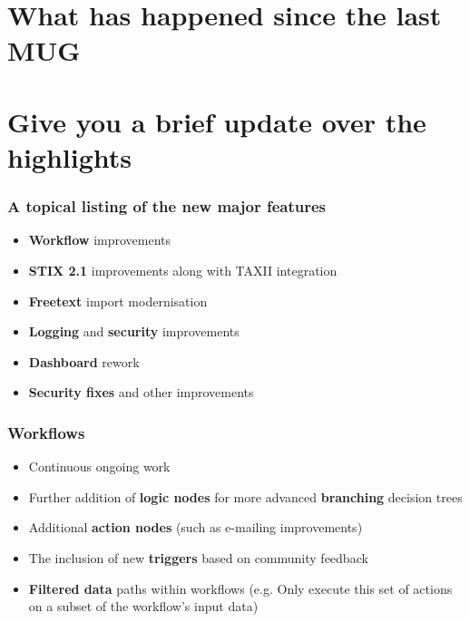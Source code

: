 
\begin{frame}
\titlepage
\end{frame}


\section{What has happened since the last MUG}

\section{Give you a brief update over the highlights}

\begin{frame}
  \frametitle{A topical listing of the new major features}
  \begin{itemize}
      \item {\bf Workflow} improvements
      \item {\bf STIX 2.1} improvements along with TAXII integration
      \item {\bf Freetext} import modernisation
      \item {\bf Logging} and {\bf security} improvements
      \item {\bf Dashboard} rework
      \item {\bf Security fixes} and other improvements
  \end{itemize}
\end{frame}


\begin{frame}
  \frametitle{Workflows}
  \begin{itemize}
     \item Continuous ongoing work
     \item Further addition of {\bf logic nodes} for more advanced {\bf branching} decision trees
     \item Additional {\bf action nodes} (such as e-mailing improvements)
     \item The inclusion of new {\bf triggers} based on community feedback
     \item {\bf Filtered data} paths within workflows (e.g. Only execute this set of actions on a subset of the workflow's input data)
  \end{itemize}
\end{frame}

